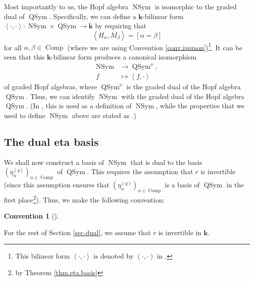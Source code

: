 \documentclass[numbers=enddot,12pt,final,onecolumn,notitlepage]{scrartcl}%
\theoremstyle{definition}
\newtheorem{conv}[theo]{Convention}
\newenvironment{convention}[1][]
{\begin{conv}[#1]\begin{leftbar}}
{\end{leftbar}\end{conv}}
\begin{document}
Most importantly to us, the Hopf algebra $\operatorname*{NSym}$ is isomorphic
to the graded dual of $\operatorname*{QSym}$. Specifically, we can define a
$\mathbf{k}$-bilinear form $\left\langle \cdot,\cdot\right\rangle
:\operatorname*{NSym}\times\operatorname*{QSym}\rightarrow\mathbf{k}$ by
requiring that%
\begin{equation}
\left\langle H_{\alpha},M_{\beta}\right\rangle =\left[  \alpha=\beta\right]
\label{eq.dual.HM}%
\end{equation}
for all $\alpha,\beta\in\operatorname*{Comp}$ (where we are using Convention
\ref{conv.iverson})\footnote{This bilinear form $\left\langle \cdot
,\cdot\right\rangle $ is denoted by $\left(  \cdot,\cdot\right)  $ in
\cite[\S 5.4]{GriRei}.}. It can be seen that this $\mathbf{k}$-bilinear form
produces a canonical isomorphism%
\begin{align*}
\operatorname*{NSym}  &  \rightarrow\operatorname*{QSym}\nolimits^{o},\\
f  &  \mapsto\left\langle f,\cdot\right\rangle
\end{align*}
of graded Hopf algebras, where $\operatorname*{QSym}\nolimits^{o}$ is the
graded dual of the Hopf algebra $\operatorname*{QSym}$. Thus, we can identify
$\operatorname*{NSym}$ with the graded dual of the Hopf algebra
$\operatorname*{QSym}$. (In \cite[\S 5.4]{GriRei}, this is used as a
definition of $\operatorname*{NSym}$, while the properties that we used to
define $\operatorname*{NSym}$ above are stated as \cite[Theorem 5.4.2]{GriRei}.)

\subsection{The dual eta basis}

We shall now construct a basis of $\operatorname*{NSym}$ that is dual to the
basis $\left(  \eta_{\alpha}^{\left(  q\right)  }\right)  _{\alpha
\in\operatorname*{Comp}}$ of $\operatorname*{QSym}$. This requires the
assumption that $r$ is invertible (since this assumption ensures that $\left(
\eta_{\alpha}^{\left(  q\right)  }\right)  _{\alpha\in\operatorname*{Comp}}$
is a basis of $\operatorname*{QSym}$ in the first place\footnote{by Theorem
\ref{thm.eta.basis}}). Thus, we make the following convention:

\begin{convention}
\label{conv.r-ible}For the rest of Section \ref{sec.dual}, we assume that $r$
is invertible in $\mathbf{k}$.
\end{convention}
\end{document}
